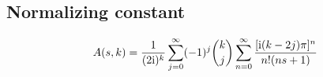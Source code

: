 \subsection{Normalizing constant}
\begin{thm}
	\[A(s,k) = \frac{1}{(2\mathrm i)^k} \sum_{j=0}^\infty (-1)^j {k \choose j} \sum_{n=0}^{\infty} \frac{[\mathrm i (k-2j) \pi]^n}{n! (ns+1)} \]
\end{thm}

